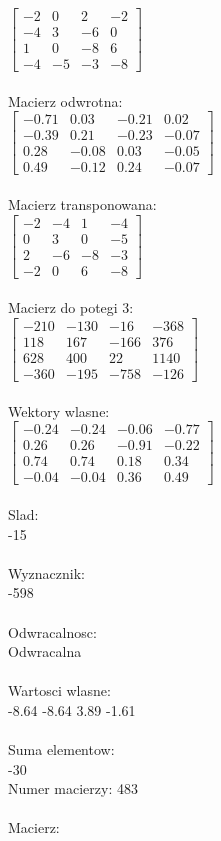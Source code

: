 \documentclass[a4paper,12pt]{article}
\begin{document}
$\begin{bmatrix} -2&0&2&-2\\-4&3&-6&0\\1&0&-8&6\\-4&-5&-3&-8 \end{bmatrix}$
\\
\\
Macierz odwrotna:\\

$\begin{bmatrix} -0.71&0.03&-0.21&0.02\\-0.39&0.21&-0.23&-0.07\\0.28&-0.08&0.03&-0.05\\0.49&-0.12&0.24&-0.07 \end{bmatrix}$
\\
\\
Macierz transponowana:\\

$\begin{bmatrix} -2&-4&1&-4\\0&3&0&-5\\2&-6&-8&-3\\-2&0&6&-8 \end{bmatrix}$
\\
\\
Macierz do potegi 3:\\

$\begin{bmatrix} -210&-130&-16&-368\\118&167&-166&376\\628&400&22&1140\\-360&-195&-758&-126 \end{bmatrix}$
\\
\\
Wektory wlasne:\\

$\begin{bmatrix} -0.24&-0.24&-0.06&-0.77\\0.26&0.26&-0.91&-0.22\\0.74&0.74&0.18&0.34\\-0.04&-0.04&0.36&0.49 \end{bmatrix}$
\\
\\
Slad:\\
-15
\\
\\
Wyznacznik:\\
-598
\\
\\
Odwracalnosc:\\
Odwracalna
\\
\\
Wartosci wlasne:\\
-8.64 -8.64 3.89 -1.61
\\
\\
Suma elementow:\\
-30
\\
\newpage
Numer macierzy:
483
\\
\\
Macierz:\\
\end{document}
